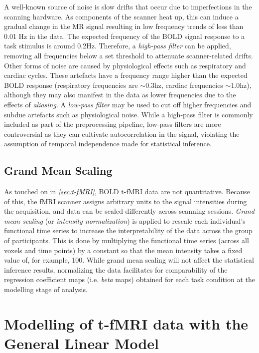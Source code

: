 A well-known source of noise is slow drifts that occur due to imperfections in the scanning hardware. As components of the scanner heat up, this can induce a gradual change in the MR signal resulting in low frequency trends of less than 0.01 Hz in the data. The expected frequency of the BOLD signal response to a task stimulus is around 0.2Hz. Therefore, a \textit{high-pass filter} can be applied, removing all frequencies below a set threshold to attenuate scanner-related drifts. Other forms of noise are caused by physiological effects such as respiratory and cardiac cycles. These artefacts have a frequency range higher than the expected BOLD response (respiratory frequencies are $\sim$0.3hz, cardiac frequencies $\sim$1.0hz), although they may also manifest in the data as lower frequencies due to the effects of \textit{aliasing}. A \textit{low-pass filter} may be used to cut off higher frequencies and subdue artefacts such as physiological noise. While a high-pass filter is commonly included as part of the preprocessing pipeline, low-pass filters are more controversial as they can cultivate autocorrelation in the signal, violating the assumption of temporal independence made for statistical inference. 

\subsection{Grand Mean Scaling}

As touched on in \textit{\ref{sec:t-fMRI}}, BOLD t-fMRI data are not quantitative. Because of this, the fMRI scanner assigns arbitrary units to the signal intensities during the acquisition, and data can be scaled differently across scanning sessions. \textit{Grand mean scaling} (or \textit{intensity normalization}) is applied to rescale each individual's functional time series to increase the interpretability of the data across the group of participants. This is done by multiplying the functional time series (across all voxels and time points) by a constant so that the mean intensity takes a fixed value of, for example, 100. While grand mean scaling will not affect the statistical inference results, normalizing the data facilitates for comparability of the regression coefficient maps (i.e. \textit{beta} maps) obtained for each task condition at the modelling stage of analysis.  

\section{Modelling of t-fMRI data with the General Linear Model}

